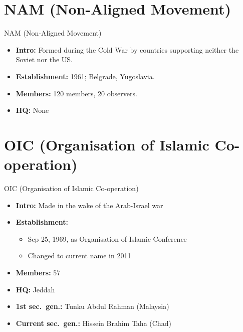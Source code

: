 \documentclass[
  12pt,
  ignorenonframetext,
  progressbar=frametitle]{beamer}
\providecommand{\tightlist}{%
  \setlength{\itemsep}{0pt}\setlength{\parskip}{0pt}}
\begin{document}
\section{NAM (Non-Aligned Movement)}
\begin{frame}[allowframebreaks]
{NAM (Non-Aligned Movement)}
\protect\hypertarget{nam-non-aligned-movement}{}
\begin{itemize}
\tightlist
\item
  \textbf{Intro:} Formed during the Cold War by countries supporting
  neither the Soviet nor the US.
\item
  \textbf{Establishment:} 1961; Belgrade, Yugoslavia.
\item
  \textbf{Members:} 120 members, 20 observers.
\item
  \textbf{HQ:} None
\end{itemize}
\end{frame}

\section{OIC (Organisation of Islamic Co-operation)}
\begin{frame}[allowframebreaks]
{OIC (Organisation of Islamic Co-operation)}
\protect\hypertarget{oic-organisation-of-islamic-co-operation}{}
\begin{itemize}
\tightlist
\item
  \textbf{Intro:} Made in the wake of the Arab-Israel war
\item
  \textbf{Establishment:}

  \begin{itemize}
  \tightlist
  \item
    Sep 25, 1969, as Organisation of Islamic Conference
  \item
    Changed to current name in 2011
  \end{itemize}
\item
  \textbf{Members:} 57
\item
  \textbf{HQ:} Jeddah
\item
  \textbf{1st sec.~gen.:} Tunku Abdul Rahman (Malaysia)
\item
  \textbf{Current sec.~gen.:} Hissein Brahim Taha (Chad)
\end{itemize}
\end{frame}
\end{document}
